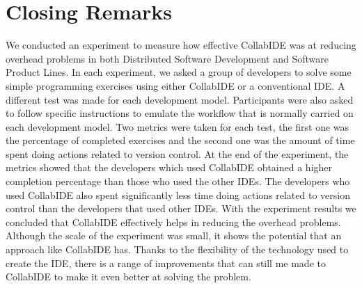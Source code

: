 \documentclass[10pt, conference, draft]{IEEEtran}
\begin{document}
\section{Closing Remarks}
\label{sec:conclusion}

We conducted an experiment to measure how effective CollabIDE was at reducing overhead problems in both Distributed Software Development and Software Product Lines. In each experiment, we asked a group of developers to solve some simple programming exercises using either CollabIDE or a conventional IDE. A different test was made for each development model. Participants were also asked to follow specific instructions to emulate the workflow that is normally carried on each development model. Two metrics were taken for each test, the first one was the percentage of completed exercises and the second one was the amount of time spent doing actions related to version control.
At the end of the experiment, the metrics showed that the developers which used CollabIDE obtained a higher completion percentage than those who used the other IDEs. The developers who used CollabIDE also spent significantly less time doing actions related to version control than the developers that used other IDEs.
With the experiment results we concluded that CollabIDE effectively helps in reducing the overhead problems. Although the scale of the experiment was small, it shows the potential that an approach like CollabIDE has. Thanks to the flexibility of the technology used to create the IDE, there is a range of improvements that can still me made to CollabIDE to make it even better at solving the problem.  


%


  
\end{document}
